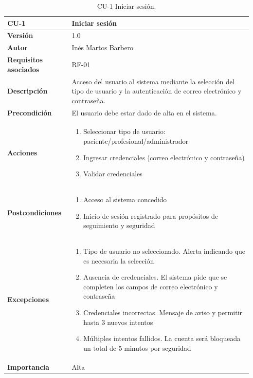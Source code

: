 \begin{table}[p]
	\centering
	\begin{tabularx}{\linewidth}{ p{} p{} }
		\toprule
		\textbf{CU-1}    & \textbf{Iniciar sesión}\\
		\toprule
        \textbf{Versión}              & 1.0    \\
		\textbf{Autor}                & Inés Martos Barbero \\
		\textbf{Requisitos asociados} & RF-01 \\
		\textbf{Descripción}          & Acceso del usuario al sistema mediante la selección del tipo de usuario y la autenticación de correo electrónico y contraseña. \\
		\textbf{Precondición}         & El usuario debe estar dado de alta en el sistema. \\
		\textbf{Acciones}             &
		\begin{enumerate}
			\def\labelenumi{\arabic{enumi}.}
			\tightlist
			\item Seleccionar tipo de usuario: paciente/profesional/administrador
			\item Ingresar credenciales (correo electrónico y contraseña)
            \item Validar credenciales
		\end{enumerate}\\
		\textbf{Postcondiciones}        & 
        \begin{enumerate}
			\def\labelenumi{\arabic{enumi}.}
			\tightlist
			\item Acceso al sistema concedido
			\item Inicio de sesión registrado para propósitos de seguimiento y seguridad
		\end{enumerate}\\
		\textbf{Excepciones}          & 
        \begin{enumerate}
			\def\labelenumi{\arabic{enumi}.}
			\tightlist
            \item Tipo de usuario no seleccionado. Alerta indicando que es necesaria la selección
            \item Ausencia de credenciales. El sistema pide que se completen los campos de correo electrónico y contraseña
			\item Credenciales incorrectas. Mensaje de aviso y permitir hasta 3 nuevos intentos
			\item Múltiples intentos fallidos. La cuenta será bloqueada un total de 5 minutos por seguridad
		\end{enumerate}\\
		\textbf{Importancia}          & Alta \\
		\bottomrule
	\end{tabularx}
	\caption{CU-1 Iniciar sesión.}
\end{table}

